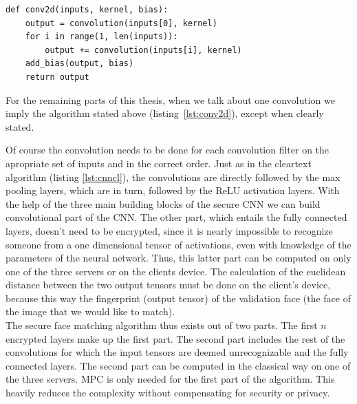 \begin{lstlisting}[caption={Code for computing total 2D convolution}, label={lst:conv2d}, frame=single, breaklines=true]
def conv2d(inputs, kernel, bias):
    output = convolution(inputs[0], kernel)
    for i in range(1, len(inputs)):
        output += convolution(inputs[i], kernel)
    add_bias(output, bias)
    return output
\end{lstlisting}

For the remaining parts of this thesis, when we talk about one convolution we imply the algorithm stated above (listing~\ref{lst:conv2d}), except when clearly stated.

Of course the convolution needs to be done for each convolution filter on the apropriate set of inputs and in the correct order. Just as in the cleartext algorithm (listing \ref{lst:cnncl}), the convolutions are directly followed by the max pooling layers, which are in turn, followed by the ReLU activation layers. With the help of the three main building blocks of the secure CNN we can build convolutional part of the CNN. The other part, which entails the fully connected layers, doesn't need to be encrypted, since it is nearly impossible to recognize someone from a one dimensional tensor of activations, even with knowledge of the parameters of the neural network. Thus, this latter part can be computed on only one of the three servers or on the clients device. The calculation of the euclidean distance between the two output tensors must be done on the client's device, because this way the fingerprint (output tensor) of the validation face (the face of the image that we would like to match).\\

The secure face matching algorithm thus exists out of two parts. The first $n$ encrypted layers make up the first part. The second part includes the rest of the convolutions for which the input tensors are deemed unrecognizable and the fully connected layers. The second part can be computed in the classical way on one of the three servers. MPC is only needed for the first part of the algorithm. This heavily reduces the complexity without compensating for security or privacy.


